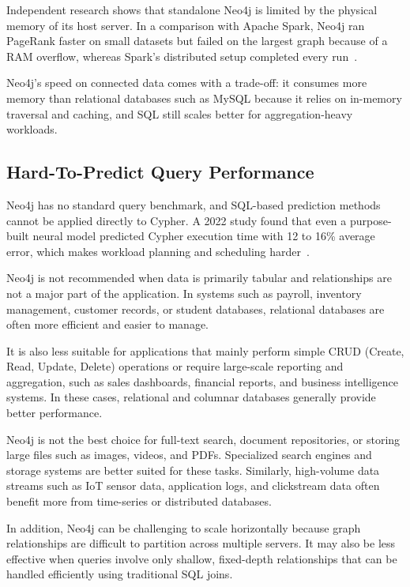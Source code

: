 \documentclass[10pt,a4paper,twocolumn]{article}
\begin{document}
Independent research shows that standalone Neo4j is limited by the physical memory of its host server. In a comparison with Apache Spark, Neo4j ran PageRank faster on small datasets but failed on the largest graph because of a RAM overflow, whereas Spark's distributed setup completed every run~\cite{ballas2020assessing}.

Neo4j's speed on connected data comes with a trade-off: it consumes more memory than relational databases such as MySQL because it relies on in-memory traversal and caching, and SQL still scales better for aggregation-heavy workloads.

\subsection{Hard-To-Predict Query Performance}

Neo4j has no standard query benchmark, and SQL-based prediction methods cannot be applied directly to Cypher. A 2022 study found that even a purpose-built neural model predicted Cypher execution time with 12 to 16\% average error, which makes workload planning and scheduling harder~\cite{he2022execution}.

Neo4j is not recommended when data is primarily tabular and relationships are not a major part of the application. In systems such as payroll, inventory management, customer records, or student databases, relational databases are often more efficient and easier to manage.

It is also less suitable for applications that mainly perform simple CRUD (Create, Read, Update, Delete) operations or require large-scale reporting and aggregation, such as sales dashboards, financial reports, and business intelligence systems. In these cases, relational and columnar databases generally provide better performance.

Neo4j is not the best choice for full-text search, document repositories, or storing large files such as images, videos, and PDFs. Specialized search engines and storage systems are better suited for these tasks. Similarly, high-volume data streams such as IoT sensor data, application logs, and clickstream data often benefit more from time-series or distributed databases.

In addition, Neo4j can be challenging to scale horizontally because graph relationships are difficult to partition across multiple servers. It may also be less effective when queries involve only shallow, fixed-depth relationships that can be handled efficiently using traditional SQL joins.
\end{document}
